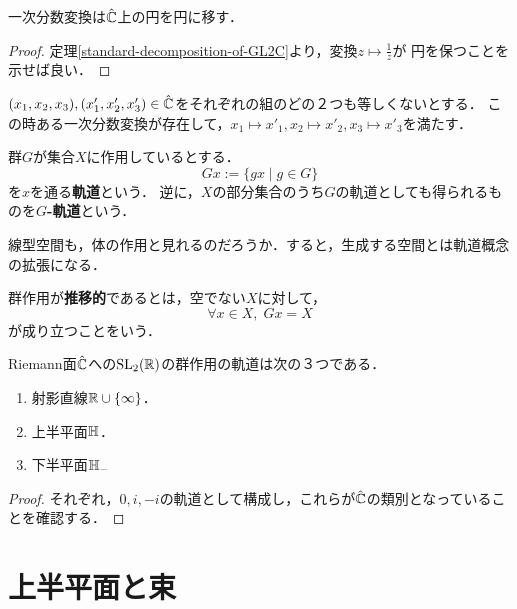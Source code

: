 \documentclass[uplatex, 12pt, dvipdfmx]{jsreport}
\begin{document}
\begin{theorem}[円円対応]
    一次分数変換は$\hat{\mathbb{C}}$上の円を円に移す．
\end{theorem}
\begin{proof}
    定理\ref{standard-decomposition-of-GL2C}より，変換$z\mapsto\frac{1}{z}$が
    円を保つことを示せば良い．
\end{proof}

\begin{thebibliography}
    $(x_1,x_2,x_3),(x'_1,x'_2,x'_3)\in\hat{\mathbb{C}}$をそれぞれの組のどの２つも等しくないとする．
    この時ある一次分数変換が存在して，$x_1\mapsto x'_1,x_2\mapsto x'_2,x_3\mapsto x'_3$を満たす．
\end{thebibliography}

\begin{definition}[orbit]
    群$G$が集合$X$に作用しているとする．
    \[ Gx:=\{gx\mid g\in G\} \]
    を$x$を通る\textbf{軌道}という．
    逆に，$X$の部分集合のうち$G$の軌道としても得られるものを\textbf{$G$-軌道}という．
\end{definition}
\begin{remark}
    線型空間も，体の作用と見れるのだろうか．すると，生成する空間とは軌道概念の拡張になる．
\end{remark}

\begin{definition}[transitive]
    群作用が\textbf{推移的}であるとは，空でない$X$に対して，
    \[ \forall x\in X,\; Gx=X \]
    が成り立つことをいう．
\end{definition}

\begin{theorem}
    Riemann面$\hat{\mathbb{C}}$への$\mathrm{SL}_2(\mathbb{R})$の群作用の軌道は次の３つである．
    \begin{enumerate}
        \item 射影直線$\mathbb{R}\cup\{\infty\}$．
        \item 上半平面$\mathbb{H}$．
        \item 下半平面$\mathbb{H}_-$
    \end{enumerate}
\end{theorem}
\begin{proof}
    それぞれ，$0,i,-i$の軌道として構成し，これらが$\hat{\mathbb{C}}$の類別となっていることを確認する．
\end{proof}

\section{上半平面と束}
\end{document}
